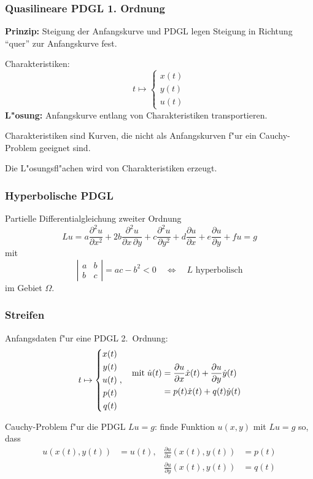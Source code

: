 \documentclass{beamer}
\begin{document}
\begin{frame}
\frametitle{Quasilineare PDGL 1. Ordnung}

{\bf Prinzip:} Steigung der Anfangskurve und PDGL legen Steigung in Richtung
``quer'' zur Anfangskurve fest.
\pause
\bigskip

Charakteristiken:
\[
t\mapsto \left\{\begin{aligned}
x(t)\\
y(t)\\
u(t)
\end{aligned}\right.
\]
{\bf L"osung:} Anfangskurve entlang von Charakteristiken transportieren.
\pause

\begin{definition}
Charakteristiken sind Kurven, die {\color{red}nicht} als Anfangskurven f"ur ein
Cauchy-Problem geeignet sind.
\end{definition}

\begin{theorem}
Die L"osungsfl"achen wird von Charakteristiken erzeugt.
\end{theorem}

\end{frame}

\begin{frame}
\frametitle{Hyperbolische PDGL}
Partielle Differentialgleichung zweiter Ordnung
\[
Lu
=
a\frac{\partial^2 u}{\partial x^2}
+
2b \frac{\partial^2 u}{\partial x\,\partial y}
+
c\frac{\partial^2 u}{\partial y^2}
+
d\frac{\partial u}{\partial x}
+
e\frac{\partial u}{\partial y}
+
fu=g
\]
mit
\[
\left|\begin{matrix}
a&b\\b&c
\end{matrix}\right|
=ac-b^2 < 0
\quad\Leftrightarrow\quad
\text{$L$ hyperbolisch}
\]
im Gebiet $\Omega$.
\end{frame}

\begin{frame}
\frametitle{Streifen}

Anfangsdaten f"ur eine PDGL 2.~Ordnung:
\[
t\mapsto
\left\{
\begin{aligned}
x(t)\\
y(t)\\
u(t)\\
p(t)\\
q(t)
\end{aligned}
\right.
,
\quad
\begin{aligned}
\text{mit\;}
\dot u(t)
&=
\frac{\partial u}{\partial x}\dot x(t) + \frac{\partial u}{\partial y}\dot y(t)\\
&=p(t)\dot x(t)+q(t)\dot y(t)
\end{aligned}
\]

\begin{definition}
Cauchy-Problem f"ur die PDGL $Lu = g$: finde Funktion $u(x,y)$ mit $Lu=g$ so,
dass
\begin{align*}
u(x(t),y(t))&=u(t), &\frac{\partial u}{\partial x}(x(t),y(t))&=p(t)\\
            &       &\frac{\partial u}{\partial y}(x(t),y(t))&=q(t)
\end{align*}
\end{definition}

\end{frame}
\end{document}
